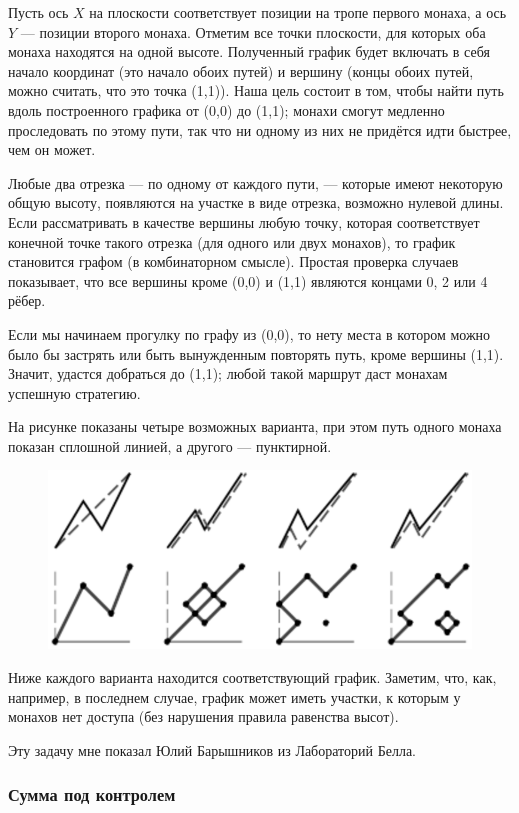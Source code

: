 Пусть ось $X$ на плоскости соответствует позиции на тропе первого монаха, а ось $Y$ --- позиции второго монаха.
Отметим все точки плоскости, для которых оба монаха находятся на одной высоте.
Полученный график будет включать в себя начало координат (это начало обоих путей) и вершину (концы обоих путей, можно считать, что это точка (1,1)).
Наша цель состоит в том, чтобы найти путь вдоль построенного графика от (0,0) до (1,1);
монахи смогут медленно проследовать по этому пути, так что ни одному из них не придётся идти быстрее, чем он может.

Любые два отрезка --- по одному от каждого пути, --- которые имеют некоторую общую высоту, появляются на участке в виде отрезка, возможно нулевой длины.
Если рассматривать в качестве вершины любую точку, которая соответствует конечной точке такого отрезка (для одного или двух монахов), то график становится графом (в комбинаторном смысле).
Простая проверка случаев показывает, что все вершины кроме (0,0) и (1,1) являются концами 0, 2 или 4 рёбер.

Если мы начинаем прогулку по графу из (0,0), то нету места в котором можно было бы застрять или быть вынужденным повторять путь, кроме вершины (1,1).
Значит, удастся добраться до (1,1); любой такой маршрут даст монахам успешную стратегию.
\heart

На рисунке показаны четыре возможных варианта, при этом путь одного монаха показан сплошной линией, а другого --- пунктирной.
\begin{figure}[h!]
\centering
\includegraphics[scale=0.9]{Figs/Toughies/monks}
\end{figure} 
Ниже каждого варианта находится соответствующий график.
Заметим, что, как, например, в последнем случае, график может иметь участки, к которым у монахов нет доступа (без нарушения правила равенства высот).

Эту задачу мне показал Юлий Барышников из Лабораторий Белла.

\subsubsection*{Сумма под контролем}

